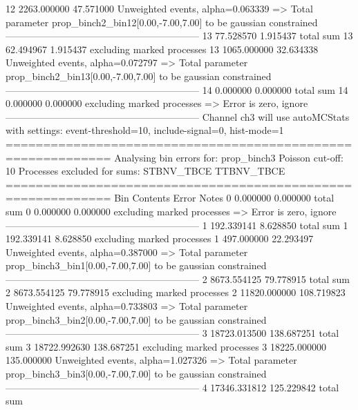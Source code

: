 12         2263.000000     47.571000       Unweighted events, alpha=0.063339
  => Total parameter prop_binch2_bin12[0.00,-7.00,7.00] to be gaussian constrained
------------------------------------------------------------
13         77.528570       1.915437        total sum                     
13         62.494967       1.915437        excluding marked processes    
13         1065.000000     32.634338       Unweighted events, alpha=0.072797
  => Total parameter prop_binch2_bin13[0.00,-7.00,7.00] to be gaussian constrained
------------------------------------------------------------
14         0.000000        0.000000        total sum                     
14         0.000000        0.000000        excluding marked processes    
  => Error is zero, ignore      
------------------------------------------------------------
Channel ch3 will use autoMCStats with settings: event-threshold=10, include-signal=0, hist-mode=1
============================================================
Analysing bin errors for: prop_binch3
Poisson cut-off: 10
Processes excluded for sums: STBNV_TBCE TTBNV_TBCE
============================================================
Bin        Contents        Error           Notes                         
0          0.000000        0.000000        total sum                     
0          0.000000        0.000000        excluding marked processes    
  => Error is zero, ignore      
------------------------------------------------------------
1          192.339141      8.628850        total sum                     
1          192.339141      8.628850        excluding marked processes    
1          497.000000      22.293497       Unweighted events, alpha=0.387000
  => Total parameter prop_binch3_bin1[0.00,-7.00,7.00] to be gaussian constrained
------------------------------------------------------------
2          8673.554125     79.778915       total sum                     
2          8673.554125     79.778915       excluding marked processes    
2          11820.000000    108.719823      Unweighted events, alpha=0.733803
  => Total parameter prop_binch3_bin2[0.00,-7.00,7.00] to be gaussian constrained
------------------------------------------------------------
3          18723.013500    138.687251      total sum                     
3          18722.992630    138.687251      excluding marked processes    
3          18225.000000    135.000000      Unweighted events, alpha=1.027326
  => Total parameter prop_binch3_bin3[0.00,-7.00,7.00] to be gaussian constrained
------------------------------------------------------------
4          17346.331812    125.229842      total sum                     
